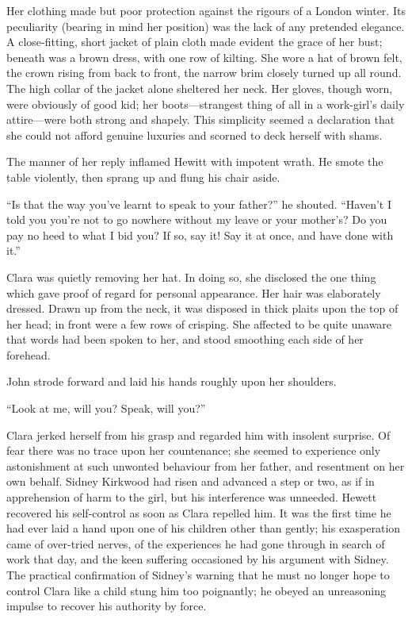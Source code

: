 Her clothing made but poor protection against the rigours of a London
winter. Its peculiarity (bearing in mind her position) was the lack of
any pretended elegance. A close-fitting, short jacket of plain cloth
made evident the grace of her bust; beneath was a brown dress, with one
row of kilting. She wore a hat of brown felt, the crown rising from back
to front, the narrow brim closely turned up all round. The high collar
of the jacket alone sheltered her neck. Her gloves, though worn, were
obviously of good kid; her boots---strangest thing of all in a
work-girl's daily attire---were both strong and shapely. This simplicity
seemed a declaration that she could not afford genuine luxuries and
scorned to deck herself with shams.

The manner of her reply inflamed Hewitt with impotent wrath. He smote
the table violently, then sprang up and flung his chair aside.

{\protect\hypertarget{63}{}{}}``Is that the way you've learnt to speak
to your father?'' he shouted. ``Haven't I told you you're not to go
nowhere without my leave or your mother's? Do you pay no heed to what I
bid you? If so, say it! Say it at once, and have done with it.''

Clara was quietly removing her hat. In doing so, she disclosed the one
thing which gave proof of regard for personal appearance. Her hair was
elaborately dressed. Drawn up from the neck, it was disposed in thick
plaits upon the top of her head; in front were a few rows of crisping.
She affected to be quite unaware that words had been spoken to her, and
stood smoothing each side of her forehead.

John strode forward and laid his hands roughly upon her shoulders.

``Look at me, will you? Speak, will you?''

Clara jerked herself from his grasp and regarded him with insolent
surprise. Of fear there was no trace upon her countenance; she seemed to
experience only astonishment {\protect\hypertarget{64}{}{}}at such
unwonted behaviour from her father, and resentment on her own behalf.
Sidney Kirkwood had risen and advanced a step or two, as if in
apprehension of harm to the girl, but his interference was unneeded.
Hewett recovered his self-control as soon as Clara repelled him. It was
the first time he had ever laid a hand upon one of his children other
than gently; his exasperation came of over-tried nerves, of the
experiences he had gone through in search of work that day, and the keen
suffering occasioned by his argument with Sidney. The practical
confirmation of Sidney's warning that he must no longer hope to control
Clara like a child stung him too poignantly; he obeyed an unreasoning
impulse to recover his authority by force.

